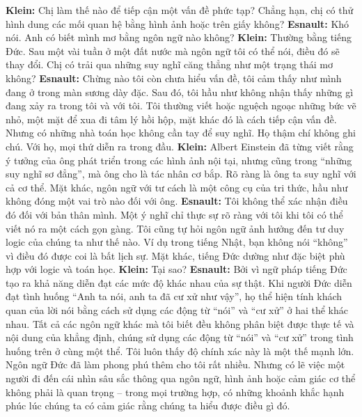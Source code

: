 \begin{multicols}{2}
	\vskip 0.1cm
	\textbf{\color{doithoaitoanhoc}Klein:} Chị làm thế nào để tiếp cận một vấn đề phức tạp? Chẳng hạn, chị có thử hình dung các mối quan hệ bằng hình ảnh hoặc trên giấy không?
	\vskip 0.1cm
	\textbf{\color{doithoaitoanhoc}Esnault:} Khó nói. Anh có biết mình mơ bằng ngôn ngữ nào không?
	\vskip 0.1cm
	\textbf{\color{doithoaitoanhoc}Klein:} Thường bằng tiếng Đức. Sau một vài tuần ở một đất nước mà ngôn ngữ tôi có thể nói, điều đó sẽ thay đổi. Chị có trải qua những suy nghĩ căng thẳng như một trạng thái mơ không?
	\vskip 0.1cm
	\textbf{\color{doithoaitoanhoc}Esnault:} Chừng nào tôi còn chưa hiểu vấn đề, tôi cảm thấy như mình đang ở trong màn sương dày đặc. Sau đó, tôi hầu như không nhận thấy những gì đang xảy ra trong tôi và với tôi. Tôi thường viết hoặc nguệch ngoạc những bức vẽ nhỏ, một mặt để xua đi tâm lý hồi hộp, mặt khác đó là cách tiếp cận vấn đề. Nhưng có những nhà toán học không cần tay để suy nghĩ. Họ thậm chí không ghi chú. Với họ, mọi thứ diễn ra trong đầu.
	\vskip 0.1cm
	\textbf{\color{doithoaitoanhoc}Klein:} Albert Einstein đã từng viết rằng ý tưởng của ông phát triển trong các hình ảnh nội tại, nhưng cũng trong ``những suy nghĩ sơ đẳng”, mà ông cho là tác nhân cơ bắp. Rõ ràng là ông ta suy nghĩ với cả cơ thể. Mặt khác, ngôn ngữ với tư cách là một công cụ của tri thức, hầu như không đóng một vai trò nào đối với ông.
	\vskip 0.1cm
	\textbf{\color{doithoaitoanhoc}Esnault:} Tôi không thể xác nhận điều đó đối với bản thân mình. Một ý nghĩ chỉ thực sự rõ ràng với tôi khi tôi có thể viết nó ra một cách gọn gàng. Tôi cũng tự hỏi ngôn ngữ ảnh hưởng đến tư duy logic của chúng ta như thế nào. Ví dụ trong tiếng Nhật, bạn không nói “không” vì điều đó được coi là bất lịch sự. Mặt khác, tiếng Đức dường như đặc biệt phù hợp với logic và toán học.
	\vskip 0.1cm
	\textbf{\color{doithoaitoanhoc}Klein:} Tại sao?
	\vskip 0.1cm
	\textbf{\color{doithoaitoanhoc}Esnault:} Bởi vì ngữ pháp tiếng Đức tạo ra khả năng diễn đạt các mức độ khác nhau của sự thật. Khi người Đức diễn đạt tình huống ``Anh ta nói, anh ta đã cư xử như vậy”, họ thể hiện tính khách quan của lời nói bằng cách sử dụng các động từ ``nói” và ``cư xử” ở hai thể khác nhau. Tất cả các ngôn ngữ khác mà tôi biết đều không phân biệt được thực tế và nội dung của khẳng định, chúng sử dụng các động từ ``nói” và ``cư xử” trong tình huống trên ở cùng một thể. Tôi luôn thấy độ chính xác này là một thế mạnh lớn. Ngôn ngữ Đức đã làm phong phú thêm cho tôi rất nhiều. Nhưng có lẽ việc một người đi đến cái nhìn sâu sắc thông qua ngôn ngữ, hình ảnh hoặc cảm giác cơ thể không phải là quan trọng -- trong mọi trường hợp, có những khoảnh khắc hạnh phúc lúc chúng ta có cảm giác rằng chúng ta hiểu được điều gì đó.

\end{multicols}

